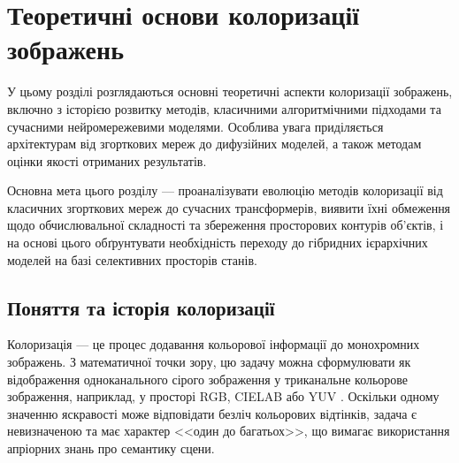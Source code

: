 
\chapter{Теоретичні основи колоризації зображень}
    \label{chap:review_theory}
        У цьому розділі розглядаються основні теоретичні аспекти колоризації зображень, включно з історією розвитку методів, класичними алгоритмічними підходами та сучасними нейромережевими моделями.
        Особлива увага приділяється архітектурам від згорткових мереж до дифузійних моделей, а також методам оцінки якості отриманих результатів.

        Основна мета цього розділу --- проаналізувати еволюцію методів колоризації від класичних згорткових мереж до сучасних трансформерів,
        виявити їхні обмеження щодо обчислювальної складності та збереження просторових контурів об'єктів,
        і на основі цього обґрунтувати необхідність переходу до гібридних ієрархічних моделей на базі селективних просторів станів.

    \section{Поняття та історія колоризації}

        Колоризація --- це процес додавання кольорової інформації до монохромних зображень.
        З математичної точки зору, цю задачу можна сформулювати як відображення одноканального сірого зображення у триканальне кольорове зображення, наприклад, у просторі RGB, CIELAB або YUV \cite{2025-survey}.
        Оскільки одному значенню яскравості може відповідати безліч кольорових відтінків, задача є невизначеною та має характер <<один до багатьох>>, що вимагає використання апріорних знань про семантику сцени.


